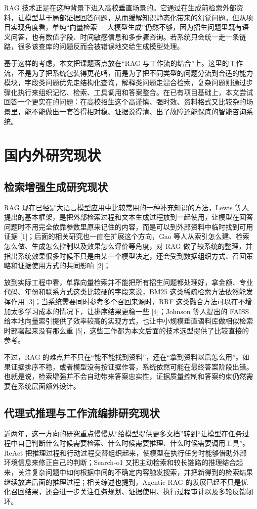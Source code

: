 \documentclass[UTF8,zihao=-4,oneside]{ctexbook}
\numberwithin{equation}{chapter}
\begin{document}
RAG 技术正是在这种背景下进入高校垂直场景的。它通过在生成前检索外部资料，让模型基于局部证据回答问题，从而缓解知识静态化带来的幻觉问题\cite{lewis2020rag,gao2023survey}。但从项目实现角度看，单纯“向量检索 + 大模型生成”仍然不够，因为招生问题里既有语义问答，也有数值字段、时间敏感信息和多步骤咨询。若系统只会统一走一条链路，很多该查库的问题反而会被错误地交给生成模型处理。

基于这样的考虑，本文把课题落点放在“RAG 与工作流的结合”上。这里的工作流，不是为了把系统包装得更花哨，而是为了把不同类型的问题分流到合适的能力模块，字段类问题优先走结构化查询，解释类问题走混合检索，复杂问题则通过步骤化执行来组织记忆、检索、工具调用和答案整合。在已有项目基础上，本文尝试回答一个更实在的问题：在高校招生这个高谨慎、强时效、资料格式又比较杂的场景里，能不能做出一套答得相对稳、证据说得清、出了故障还能保底的智能咨询系统。

\section{国内外研究现状}
\subsection{检索增强生成研究现状}
RAG 现在已经是大语言模型应用中比较常用的一种补充知识的方法，Lewis 等人提出的基本框架，是把外部检索过程和文本生成过程放到一起使用，让模型在回答问题时不用完全依靠参数里原来记住的内容，而是可以到外部资料中临时找到可用证据 [1]；后面的相关研究也一直在扩展这个方向，Gao 等人从索引怎么建、检索怎么做、生成怎么控制以及效果怎么评价等角度，对 RAG 做了较系统的整理，并指出系统效果很多时候不只是由某一个模型决定，还会受到数据组织方式、召回策略和证据使用方式的共同影响 [2]；

放到实际工程中看，单靠向量检索并不能把所有招生问题都处理好，拿金额、专业代码、年份和联系方式这类比较硬的字段来说，BM25 这类稀疏检索方法依然能发挥作用 [3]；当系统需要同时参考多个召回来源时，RRF 这类融合方法可以在不增加太多学习成本的情况下，让排序结果更稳一些 [4]；Johnson 等人提出的 FAISS 给本地向量索引提供了效率较高的实现方式，也让中小规模垂直语料库做相似检索时部署起来没有那么重 [5]，这些工作都为本文后面的技术选型提供了比较直接的参考。

不过，RAG 的难点并不只在“能不能找到资料”，还在“拿到资料以后怎么用”。如果证据排序不稳，或者模型没有按证据作答，系统依然可能在最终答案阶段出错。也就是说，检索增强并不会自动带来答案忠实性，证据质量控制和答案约束仍然需要在系统层面额外设计。

\subsection{代理式推理与工作流编排研究现状}
近两年，这一方向的研究重点慢慢从“给模型提供更多文档”转到“让模型在任务过程中自己判断什么时候需要检索、什么时候需要推理、什么时候需要调用工具”。ReAct 把推理过程和行动过程交替组织起来，使模型在执行任务时能够借助外部环境信息来修正自己的判断\cite{react2023}；Search-o1 又把主动检索和较长链路的推理结合起来，关注复杂问题中如何根据中间的不确定内容触发搜索，并把新得到的检索结果继续放进后面的推理过程\cite{searcho1}；相关综述也提到，Agentic RAG 的发展已经不只是优化召回结果，还会进一步关注任务规划、证据使用、执行过程审计以及多轮反馈闭环\cite{singh2025survey,agenticrag}。
\end{document}
